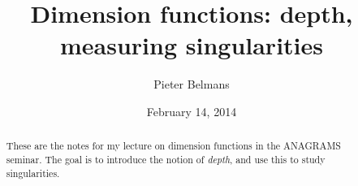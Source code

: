 \documentclass[10pt,a4paper]{article}
\title{Dimension functions: depth, measuring singularities}
\author{Pieter Belmans}
\date{February 14, 2014}
\begin{document}
\maketitle

\begin{abstract}
  These are the notes for my lecture on dimension functions in the ANAGRAMS seminar. The goal is to introduce the notion of \emph{depth}, and use this to study singularities.
\end{abstract}

\tableofcontents

\clearpage


\printbibliography
\end{document}

